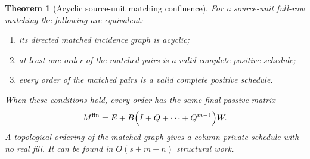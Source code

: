 \documentclass[11pt,letterpaper]{article}
\newtheorem{theorem}{Theorem}[section]
\theoremstyle{definition}
\begin{document}
\begin{theorem}[Acyclic source-unit matching confluence]\label{thm:matching}
For a source-unit full-row matching the following are equivalent:
\begin{enumerate}[label=(\roman*)]
\item its directed matched incidence graph is acyclic;
\item at least one order of the matched pairs is a valid complete positive schedule;
\item every order of the matched pairs is a valid complete positive schedule.
\end{enumerate}
When these conditions hold, every order has the same final passive matrix
\begin{equation}
 M^{\mathrm{fin}}=E+B\Bigl(I+Q+\cdots+Q^{m-1}\Bigr)W.\label{eq:pathformula}
\end{equation}
A topological ordering of the matched graph gives a column-private schedule with no real fill. It can be found in $O(s+m+n)$ structural work.
\end{theorem}
\end{document}
